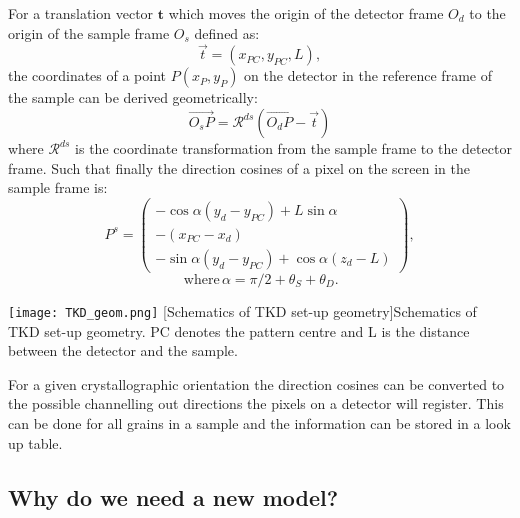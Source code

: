 \noindent \begin{minipage}{0.55\textwidth}
\vspace{0.5cm}
For a translation vector $\textbf{t}$ which moves the origin of the detector frame $O_d$ to the origin of the sample frame $O_s$ defined as:
\begin{equation*}
    \vec{t}=(x_{PC}, y_{PC}, L),
\end{equation*}
the coordinates of a point $P(x_P, y_P)$ on the detector in the reference frame of the sample can be derived geometrically:
\begin{equation*}
   \vec{O_sP} = \mathcal{R}^{ds}(\vec{O_dP} -\vec{t})
\end{equation*}
where   $\mathcal{R}^{ds}$    is the coordinate transformation from the sample frame to the detector frame. Such that finally the direction cosines of a pixel on the screen in the sample frame is:
\begin{equation*}
    P^s=\begin{pmatrix}
    -\cos{\alpha}(y_d-y_{PC}) + L \sin{\alpha}   \\
    -(x_{PC}-x_d)\\
    -\sin{\alpha}(y_d-y_{PC}) + \cos{\alpha}(z_d-L)  
    \end{pmatrix}, 
\end{equation*}
\begin{equation*}
     \, \text{where} \,\alpha =\pi/2 + \theta_S + \theta_D.   
\end{equation*}    
\end{minipage}
\begin{minipage}{0.45\textwidth}
    \centering
\texttt{[image: TKD\_geom.png]}
\captionsetup{width=0.7\linewidth}
[Schematics of TKD set-up geometry]{Schematics of TKD set-up geometry. PC denotes the pattern centre and L is the distance between the detector and the sample.} 
\label{fig:TKDgeometry}
\end{minipage}

\vspace{0.3cm}


For a given crystallographic orientation the direction cosines can be converted to the possible channelling out directions the pixels on a detector will register. This can be done for all grains in a sample and the information  can be stored in a look up table.






\subsection{Why do we need a new model?}
\label{sec:motivation}


